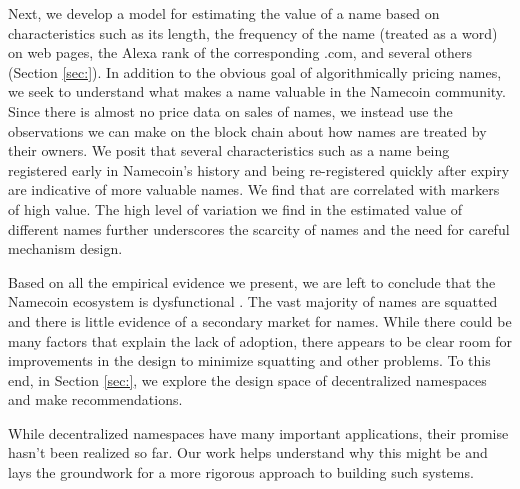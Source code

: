 Next, we develop a model for estimating the value of a name based on characteristics such as its length, the frequency of the name (treated as a word) on web pages, the Alexa rank of the corresponding .com, and several others (Section \ref{sec:}). In addition to the obvious goal of algorithmically pricing names, we seek to understand what makes a name valuable in the Namecoin community. Since there is almost no price data on sales of names, we instead use the observations we can make on the block chain about how names are treated by their owners. We posit that several characteristics such as a name being registered early in Namecoin's history and being re-registered quickly after expiry are indicative of more valuable names. We find that  are correlated with markers of high value. The high level of variation we find in the estimated value of different names further underscores the scarcity of names and the need for careful mechanism design.

Based on all the empirical evidence we present, we are left to conclude that the Namecoin ecosystem is dysfunctional . The vast majority of names are squatted and there is little evidence of a secondary market for names. While there could be many factors that explain the lack of adoption, there appears to be clear room for improvements in the design to minimize squatting and other problems. To this end, in Section \ref{sec:}, we explore the design space of decentralized namespaces and make recommendations.

While decentralized namespaces have many important applications, their promise hasn't been realized so far. Our work helps understand why this might be and lays the groundwork for a more rigorous approach to building such systems.


